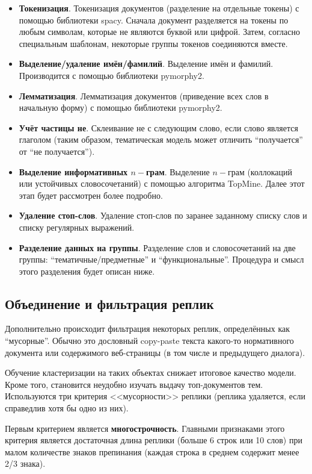 \begin{itemize}

\item \textbf{Токенизация}. Токенизация документов (разделение на отдельные токены) с помощью библиотеки spacy. Сначала документ разделяется на токены по любым символам, которые не являются буквой или цифрой. Затем, согласно специальным шаблонам, некоторые группы токенов соединяются вместе.
\item \textbf{Выделение/удаление имён/фамилий}. Выделение имён и фамилий. Производится с помощью библиотеки pymorphy2.
\item \textbf{Лемматизация}. Лемматизация документов (приведение всех слов в начальную форму) с помощью библиотеки pymorphy2. 
\item \textbf{Учёт частицы не}. Склеивание не с следующим слово, если слово является глаголом (таким образом, тематическая модель может отличить ``получается'' от ``не получается'').
\item \textbf{Выделение информативных $n-$грам}. Выделение $n-$грам (коллокаций или устойчивых словосочетаний) с помощью алгоритма TopMine. Далее этот этап будет рассмотрен более подробно.
\item \textbf{Удаление стоп-слов}. Удаление стоп-слов по заранее заданному списку слов и списку регулярных выражений.
\item \textbf{Разделение данных на группы}. Разделение слов и словосочетаний на две группы: “тематичные/предметные” и “функциональные”. Процедура и смысл этого разделения будет описан ниже.
\end{itemize}

\subsection{Объединение и фильтрация реплик} 

Дополнительно происходит фильтрация некоторых реплик, определённых как “мусорные”. Обычно это дословный copy-paste текста какого-то нормативного документа или содержимого веб-страницы (в том числе и предыдущего диалога). 

Обучение кластеризации на таких объектах снижает итоговое качество модели. Кроме того, становится неудобно изучать выдачу топ-документов тем. Используются три критерия <<мусорности>> реплики (реплика удаляется, если справедлив хотя бы одно из них).

Первым критерием является \textbf{многострочность}. Главными признаками этого критерия является достаточная длина реплики (больше 6 строк или 10 слов) при малом количестве знаков препинания (каждая строка в среднем содержит менее 2/3 знака).

